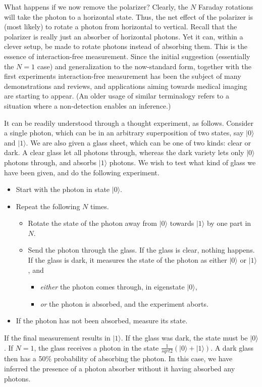\documentclass[12pt,aps,prb,preprint]{revtex4}
\def\ket#1{|#1\rangle}
\begin{document}
What happens if we now remove the polarizer?  Clearly, the $N$ Faraday
rotations will take the photon to a horizontal state.  Thus, the net
effect of the polarizer is (most likely) to rotate a photon from
horizontal to vertical.  Recall that the polarizer is really just an
absorber of horizontal photons.  Yet it can, within a clever setup, be
made to rotate photons instead of absorbing them.  This is the essence
of interaction-free measurement.  Since the initial suggestion
(essentially the $N=1$ case)\cite{1993FoPh...23..987E} and
generalization to the now-standard form, together with the first
experiments\cite{PhysRevLett.74.4763} interaction-free measurement has
been the subject of many
demonstrations\cite{voorthuysen:1504,2006JPhB...39.3177N} and
reviews,\cite{deweerd:272} and applications aiming towards medical
imaging are starting to appear\cite{PhysRevA.80.040902}.  (An older
usage of similar
terminalogy\cite{springerlink:10.1007/BF01327019,dicke:925} refers to
a situation where a non-detection enables an inference.)


It can be readily understood through a thought experiment, as follows.
Consider a single photon, which can be in an arbitrary superposition
of two states, say $\ket0$ and $\ket1$.  We are also given a glass
sheet, which can be one of two kinds: clear or dark.  A clear glass
let all photons through, whereas the dark variety lets only $\ket0$
photons through, and absorbs $\ket1$ photons.  We wish to test what
kind of glass we have been given, and do the following experiment.
\begin{itemize}
\item Start with the photon in state $\ket0$.
\item Repeat the following $N$ times.
\begin{itemize}
\item Rotate the state of the photon away from $\ket0$ towards $\ket1$
  by one part in $N$.
\item Send the photon through the glass.  If the glass is clear,
  nothing happens.  If the glass is dark, it measures the state
  of the photon as either $\ket0$ or $\ket1$, and
\begin{itemize}
\item {\em either\/} the photon comes through, in eigenstate $\ket0$,
\item {\em or\/} the photon is absorbed, and the experiment aborts.
\end{itemize}
\end{itemize}
\item If the photon has not been absorbed, measure its state.
\end{itemize}
\noindent If the final measurement results in $\ket1$.  If the glass
was dark, the state must be $\ket0$.  If $N=1$, the glass receives a
photon in the state $\frac1{sqrt2}\left(\ket0+\ket1\right)$.  A dark
glass then has a 50\% probability of absorbing the photon.  In this
case, we have inferred the presence of a photon absorber without it
having absorbed any photons.  
\end{document}
